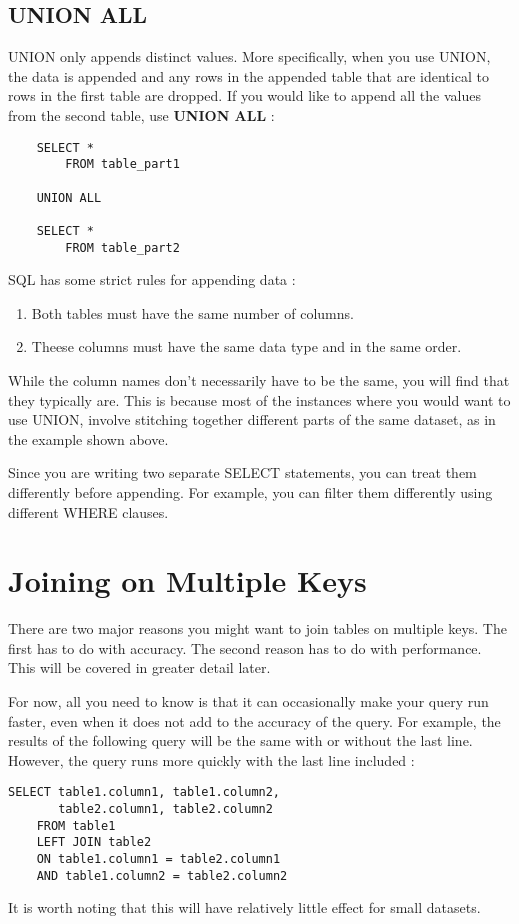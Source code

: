 \documentclass[12pt, letterpaper]{article}
\begin{document}
\subsection{UNION ALL}
UNION only appends distinct values. More specifically, when you use UNION, the data is appended and any rows in the appended table that are identical to rows in the first table are dropped. If you would like to append all the values from the second table, use \textbf{UNION ALL} : 

\begin{verbatim}
    SELECT *
        FROM table_part1

    UNION ALL

    SELECT *
        FROM table_part2
\end{verbatim}

SQL has some strict rules for appending data : 

\begin{enumerate}
    \item Both tables must have the same number of columns.
    \item Theese columns must have the same data type and in the same order.
\end{enumerate}

While the column names don't necessarily have to be the same, you will find that they typically are. This is because most of the instances where you would want to use UNION, involve stitching together different parts of the same dataset, as in the example shown above.

Since you are writing two separate SELECT statements, you can treat them differently before appending. For example, you can filter them differently using different WHERE clauses.


\section{Joining on Multiple Keys}
There are two major reasons you might want to join tables on multiple keys. The first has to do with accuracy. The second reason has to do with performance. This will be covered in greater detail later. 

For now, all you need to know is that it can occasionally make your query run faster, even when it does not add to the accuracy of the query. For example, the results of the following query will be the same with or without the last line. However, the query runs more quickly with the last line included : 

\begin{verbatim}
SELECT table1.column1, table1.column2,
       table2.column1, table2.column2
    FROM table1
    LEFT JOIN table2 
    ON table1.column1 = table2.column1
    AND table1.column2 = table2.column2
\end{verbatim}

It is worth noting that this will have relatively little effect for small datasets.
\end{document}
